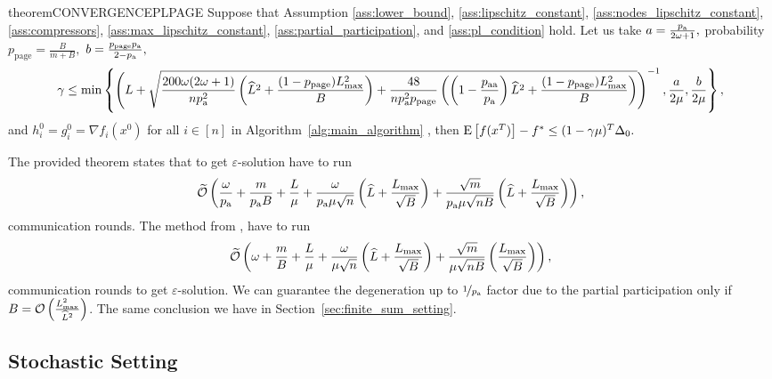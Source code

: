 \documentclass{article}
\newcommand{\algorithmname}{DASHA-PP}
\newcommand*{\probavailable}{\ensuremath{p_{\textnormal{a}}}}
\newcommand*{\probpairaa}{\ensuremath{p_{\textnormal{aa}}}}
\newcommand*{\probpage}{\ensuremath{p_{\text{page}}}}
\begin{document}
\begin{restatable}{theorem}{CONVERGENCEPLPAGE}
  \label{theorem:page_pl}
  Suppose that Assumption \ref{ass:lower_bound}, \ref{ass:lipschitz_constant}, \ref{ass:nodes_lipschitz_constant}, \ref{ass:compressors}, \ref{ass:max_lipschitz_constant}, \ref{ass:partial_participation}, and \ref{ass:pl_condition} hold. Let us take $a = \frac{\probavailable}{2 \omega + 1},$ probability $\probpage = \frac{B}{m + B}, $ $b = \frac{\probpage \probavailable}{2 - \probavailable},$
  {\scriptsize $$\gamma \leq \min\left\{\left(L + \sqrt{\frac{200 \omega (2 \omega + 1)}{n \probavailable^2} \left(\widehat{L}^2 + \frac{(1 - \probpage)L_{\max}^2}{B}\right) + \frac{48}{n \probavailable^2 \probpage}\left(\left(1 - \frac{\probpairaa}{\probavailable}\right) \widehat{L}^2 + \frac{(1 - \probpage)L_{\max}^2}{B}\right)}\right)^{-1}, \frac{a}{2\mu} , \frac{b}{2\mu}\right\},$$}
  and $h^{0}_i = g^{0}_i = \nabla f_i(x^0)$ for all $i \in [n]$ in Algorithm~\ref{alg:main_algorithm} \algname{(\algorithmname-PAGE)},
  then ${\rm E}\left[f(x^{T})\right] - f^* \leq (1 - \gamma \mu)^{T} \Delta_0.$
\end{restatable}

The provided theorem states that to get $\varepsilon$-solution \algname{\algorithmname} have to run
\begin{align*}
  \widetilde{\cO}\left(\frac{\omega}{\probavailable} + \frac{m}{\probavailable B} + \frac{L}{\mu} + \frac{\omega}{\probavailable \mu \sqrt{n}} \left(\widehat{L} + \frac{L_{\max}}{\sqrt{B}}\right) + \frac{\sqrt{m}}{\probavailable \mu \sqrt{n B}} \left(\widehat{L} + \frac{L_{\max}}{\sqrt{B}}\right)\right),
\end{align*}
communication rounds. The method  from \citep{tyurin2022dasha}, have to run
\begin{align*}
  \widetilde{\mathcal{O}}\left(\omega + \frac{m}{B} + \frac{L}{\mu} + \frac{\omega}{\mu \sqrt{n}} \left(\widehat{L} + \frac{L_{\max}}{\sqrt{B}}\right) + \frac{\sqrt{m}}{\mu \sqrt{n B}} \left(\frac{L_{\max}}{\sqrt{B}}\right)\right),
\end{align*}
communication rounds to get $\varepsilon$-solution. We can guarantee the degeneration up to $\nicefrac{1}{\probavailable}$ factor due to the partial participation only if $B = \mathcal{O}\left(\frac{L_{\max}^2}{\widehat{L}^2}\right)$. The same conclusion we have in Section~\ref{sec:finite_sum_setting}.

\subsection{Stochastic Setting}
\end{document}
